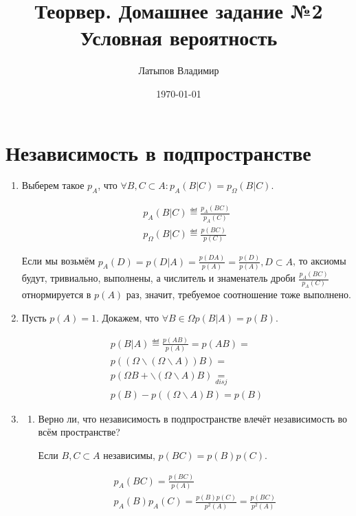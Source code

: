 \documentclass[12pt, a4paper]{article}
\title{Теорвер. Домашнее задание №2 \\ \large Условная вероятность}
\author{
  Латыпов Владимир
}
\date{\today}
\begin{document}
\maketitle
\newpage

\section{Независимость в подпространстве}

\begin{enumerate}
    \item Выберем такое $p_A$, что $\forall B, C \subset A: p_A(B | C) = p_\Omega(B | C)$.
    
    \begin{gather}
        p_A(B | C) \eqdef \frac{p_A(BC)}{p_A(C)} \\
        p_\Omega(B | C) \eqdef \frac{p(BC)}{p(C)}
    \end{gather}

    Если мы возьмём $p_A(D) = p(D | A) = \frac{p(DA)}{p(A)} = \frac{p(D)}{p(A)}, D \subset A$, 
    то аксиомы будут, тривиально, выполнены,
    а числитель и знаменатель дроби $\frac{p_A(BC)}{p_A(C)}$ отнормируется в $p(A)$ раз, 
    значит, требуемое соотношение тоже выполнено.

    \item Пусть $p(A) = 1$. Докажем, что $\forall B \in \Omega p(B | A) = p(B)$.
    
    \begin{multline}
        p(B | A) \eqdef \frac{p(AB)}{p(A)} = p(AB) = \\
        p((\Omega \backslash (\Omega \backslash A))B) = \\
        p(\Omega B + \backslash (\Omega \backslash A) B) \underset{disj} = \\
        p(B) - p((\Omega \backslash A) B) = p(B)
    \end{multline}

    \item \begin{enumerate}
        \item Верно ли, что независимость в подпространстве 
        влечёт независимость во всём пространстве?
        
        Если $B, C \subset A$ независимы, $p(BC) = p(B) p(C)$. 

        \begin{gather}
            p_A(BC) = \frac{p(BC)}{p(A)} \\
            p_A(B)p_A(C) = \frac{p(B)p(C)}{p^2(A)} = \frac{p(BC)}{p^2(A)}
        \end{gather}
        

\end{enumerate}
\end{enumerate}
\end{document}
